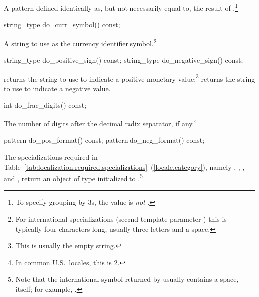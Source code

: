 \begin{itemdescr}
\pnum
\returns
A pattern defined identically as, but not necessarily equal to, the result of
.\footnote{To specify grouping by 3s,
the value is 
\textit{not}
.}
\end{itemdescr}

%
\begin{itemdecl}
string_type do_curr_symbol() const;
\end{itemdecl}

\begin{itemdescr}
\pnum
\returns
A string to use as the currency identifier symbol.\footnote{For international
specializations (second template parameter
)
this is typically four characters long, usually three letters and a space.}
\end{itemdescr}

%
%
\begin{itemdecl}
string_type do_positive_sign() const;
string_type do_negative_sign() const;
\end{itemdecl}

\begin{itemdescr}
\pnum
\returns
{}
returns the string to use to indicate a
positive monetary value;\footnote{This is usually the empty string.}
returns the string to use to indicate a negative value.
\end{itemdescr}

%
\begin{itemdecl}
int do_frac_digits() const;
\end{itemdecl}

\begin{itemdescr}
\pnum
\returns
The number of digits after the decimal radix separator, if any.\footnote{In
common U.S.\ locales, this is 2.}
\end{itemdescr}

%
%
\begin{itemdecl}
pattern do_pos_format() const;
pattern do_neg_format() const;
\end{itemdecl}

\begin{itemdescr}
\pnum
\returns
The specializations required in Table~\ref{tab:localization.required.specializations}~(\ref{locale.category}), namely
,
,
,
and
,
return an object of type
initialized to
.\footnote{Note that the international
symbol returned by
usually contains a space, itself;
for example, .}
\end{itemdescr}

